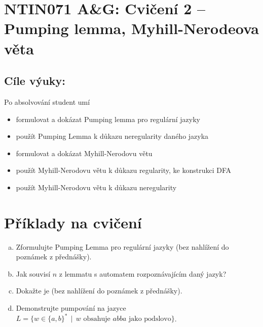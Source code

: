 \documentclass[a4paper,12pt]{amsart}
\begin{document}
\thispagestyle{empty}

\section*{NTIN071 A\&G: Cvičení 2 -- Pumping lemma, Myhill-Nerodeova věta}

\subsection*{Cíle výuky:} Po absolvování student umí

\begin{itemize}\setlength{\itemsep}{0pt}
    \item formulovat a dokázat Pumping lemma pro regulární jazyky
    \item použít Pumping Lemma k důkazu neregularity daného jazyka
    \item formulovat a dokázat Myhill-Nerodovu větu
    \item použít Myhill-Nerodovu větu k důkazu regularity, ke konstrukci DFA
    \item použít Myhill-Nerodovu větu k důkazu neregularity
\end{itemize}


\section*{Příklady na cvičení}


\medskip\begin{problem}

    \begin{enumerate}[(a)]\setlength\itemsep{6pt}
        \item Zformulujte Pumping Lemma pro regulární jazyky (bez nahlížení do poznámek z přednášky).
        \item Jak souvisí $n$ z lemmatu s automatem rozpoznávajícím daný jazyk?
        \item Dokažte je (bez nahlížení do poznámek z přednášky).
        \item Demonstrujte pumpování na jazyce $L=\{w\in\{a,b\}^* \,\mid\,\text{$w$ obsahuje $abba$ jako podslovo}\}$.
    \end{enumerate}

\end{problem}
\end{document}
